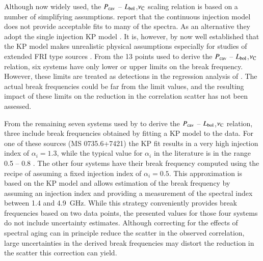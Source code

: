 \documentclass{aa}  %
\begin{document}
Although now widely used, the $P_{\rm{cav}}$ -- $L_{\rm{bol}}$,$\nu_{\rm{C}}$ scaling relation is based on a number of simplifying assumptions.
\cite{Birzan2008} report that the continuous injection model \citep[CI;][]{Kardashev1962} does not provide acceptable fits to many of the spectra. As an alternative they adopt the single injection KP model \citep[][]{Kardashev1962, Pacholczyk1970}.
It is, however, by now well established that the KP model makes unrealistic physical assumptions especially for studies of extended FRI type sources \citep[e.g.][]{Tribble1993, Harwood2013, Hardcastle2013}.
From the 13 points used to derive the $P_{\rm{cav}}$ -- $L_{\rm{bol}}$,$\nu_{\rm{C}}$ relation, six systems have only lower or upper limits on the break frequency.
However, these limits are treated as detections in the regression analysis of \cite{Birzan2008}. The actual break frequencies could be far from the limit values, and the resulting impact of these limits on the reduction in the correlation scatter has not been assessed.

From the remaining seven systems used by \cite{Birzan2008} to derive the $P_{\rm{cav}}$ -- $L_{\rm{bol}}$,$\nu_{\rm{C}}$ relation, three include break frequencies obtained by fitting a KP model to the data. 
For one of these sources (MS 0735.6+7421) the KP fit results in a very high injection index of $\alpha_i =1.3$, while the typical value for $\alpha_i$ in the literature is in the range 0.5 -- 0.8 \citep{KomissarovGubanov1994}.
The other four systems have their break frequency computed using the recipe of \citet{Myers1985} assuming a fixed injection index of $\alpha_i =0.5$. 
This approximation is based on the KP model and allows estimation of the break frequency by assuming an injection index and providing a measurement of the spectral index between 1.4 and 4.9~GHz. While this strategy conveniently provides break frequencies based on two data points, the presented values for those four systems do not include uncertainty estimates.
Although correcting for the effects of spectral aging can in principle reduce the scatter in the observed correlation, large uncertainties in the derived break frequencies may distort the reduction in the scatter this correction can yield.
\end{document}
